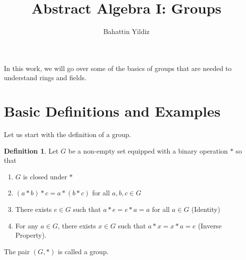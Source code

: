 \documentclass[12pt]{article}
\title{Abstract Algebra I: Groups}
\author{Bahattin Yildiz }
\date{}
\theoremstyle{plain}
\theoremstyle{definition}
\newtheorem{definition}{Definition}
\theoremstyle{remark}
\begin{document}
\maketitle
In this work, we will go over some of the basics of groups that are needed to understand rings and fields. 

\section{Basic Definitions and Examples}
Let us start with the definition of a group.
\begin{definition}
Let $G$ be a non-empty set equipped with a binary operation $*$ so that 
\begin{enumerate}
    \item $G$ is closed under $*$
    \item $(a*b)*c=a*(b*c)$ for all $a,b,c \in G$
    \item There exists $e\in G$ such that $a*e=e*a=a$ for all $a \in G$ (Identity)
    \item For any $a\in G$, there exists $x\in G$ such that $a*x=x*a=e$ (Inverse Property).
\end{enumerate}
The pair $(G, *)$ is called a group. 
\end{definition}
\end{document}
